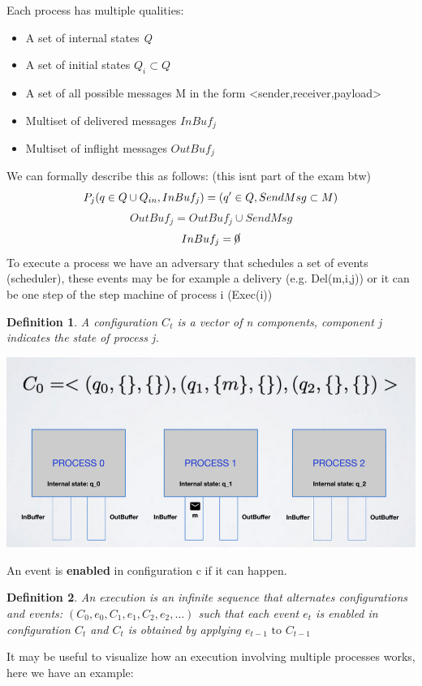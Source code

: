 \documentclass[11pt, a4paper]{article}
\newtheorem{defn}{Definition}
\begin{document}
Each process has multiple qualities:
\begin{itemize}
    \item A set of internal states \textit{Q}
    \item A set of initial states $Q_i \subset Q$
    \item A set of all possible messages M in the form <sender,receiver,payload>
    \item Multiset of delivered messages $InBuf_j$
    \item Multiset of inflight messages $OutBuf_j$
\end{itemize}
\newpage
We can formally describe this as follows: (this isnt part of the exam btw) 
$$P_j (q \in Q \cup Q_{in},InBuf_j) = (q' \in Q, SendMsg \subset M \newline)$$  $$ OutBuf_j = OutBuf_j \cup SendMsg$$ $$\newline InBuf_j = \cancel{0}$$
To execute a process we have an adversary that schedules a set of events (scheduler), these events may be for example a delivery (e.g. Del(m,i,j)) or it can be one step of the step machine of process i (Exec(i))
\begin{defn}
    A configuration $C_t$ is a vector of n components, component j indicates the state of process j.
\end{defn}
\begin{center}
    \includegraphics[scale=0.55]{img/configuration.png}
\end{center}
An event is \textbf{enabled} in configuration c if it can happen.
\begin{defn}
    An execution is an infinite sequence that alternates configurations and events: $(C_0,e_0,C_1,e_1,C_2,e_2,\dots)$ such that each event $e_t$ is enabled in configuration $C_t$ and $C_t$ is obtained by applying $e_{t-1} \text{ to } C_{t-1}$

\end{defn}
It may be useful to visualize how an execution involving multiple processes works, here we have an example:
\end{document}

